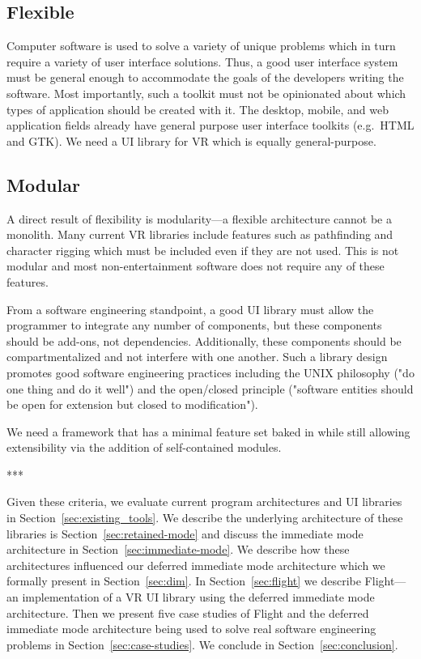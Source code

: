 \documentclass[conference,12pt]{IEEEtran}
\begin{document}
\subsection{Flexible}\label{sec:flexible}

Computer software is used to solve a variety of unique problems which in turn
require a variety of user interface solutions. Thus, a good user interface
system must be general enough to accommodate the goals of the developers
writing the software. Most importantly, such a toolkit must not be opinionated
about which types of application should be created with it. The desktop, mobile,
and web application fields already have general purpose user interface toolkits
(e.g.\ HTML and GTK). We need a UI library for VR which is equally
general-purpose.

\subsection{Modular}\label{sec:modular}

A direct result of flexibility is modularity---a flexible architecture cannot be
a monolith. Many current VR libraries include features such as pathfinding and
character rigging which must be included even if they are not used. This is not
modular and most non-entertainment software does not require any of these
features.

From a software engineering standpoint, a good UI library must allow the
programmer to integrate any number of components, but these components should
be add-ons, not dependencies. Additionally, these components should be
compartmentalized and not interfere with one another. Such a library design
promotes good software engineering practices including the UNIX philosophy ("do
one thing and do it well") and the open/closed principle ("software entities
should be open for extension but closed to modification").

We need a framework that has a minimal feature set baked in while still allowing
extensibility via the addition of self-contained modules.

\begin{center}***\end{center}

Given these criteria, we evaluate current program architectures and UI libraries
in Section~\ref{sec:existing_tools}. We describe the underlying architecture of
these libraries is Section~\ref{sec:retained-mode} and discuss the immediate
mode architecture in Section~\ref{sec:immediate-mode}. We describe how these
architectures influenced our deferred immediate mode architecture which we
formally present in Section~\ref{sec:dim}. In Section~\ref{sec:flight} we
describe Flight---an implementation of a VR UI library using the deferred
immediate mode architecture. Then we present five case studies of Flight and
the deferred immediate mode architecture being used to solve real software
engineering problems in Section~\ref{sec:case-studies}. We conclude in
Section~\ref{sec:conclusion}.
\end{document}
